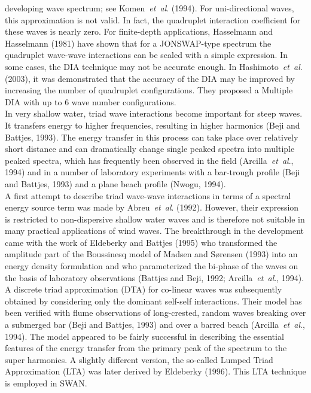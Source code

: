 \documentclass[12pt]{book}
\begin{document}
developing wave spectrum; see Komen~{\it et~al}. (1994). For uni-directional waves, this approximation is not
valid. In fact, the quadruplet interaction coefficient for these waves is nearly zero. For finite-depth
applications, Hasselmann and Hasselmann (1981) have shown that for a JONSWAP-type spectrum the quadruplet
wave-wave interactions can be scaled with a simple expression.
In some cases, the DIA technique may not be accurate enough. In Hashimoto~{\it et~al}. (2003), it was
demonstrated that the accuracy of the DIA may be improved by increasing the number of quadruplet
configurations. They proposed a Multiple DIA with up to 6 wave number configurations.
\\[2ex]
\noindent
In very shallow water, triad wave interactions become important for steep waves. It
transfers energy to higher frequencies, resulting in higher harmonics (Beji and Battjes, 1993).
The energy transfer in this process can take place over relatively short distance and can
dramatically change single peaked spectra into multiple peaked spectra, which has frequently
been observed in the field (Arcilla~{\it et~al}., 1994) and in a number of laboratory
experiments with a bar-trough profile (Beji and Battjes, 1993) and a plane beach profile
(Nwogu, 1994).
\\[2ex]
\noindent
A first attempt to describe triad wave-wave interactions in terms of a spectral energy source term was
made by Abreu~{\it et~al}. (1992). However, their expression is restricted to non-dispersive shallow water
waves and is therefore not suitable in many practical applications of wind waves. The breakthrough in the
development came with the work of Eldeberky and Battjes (1995) who transformed the amplitude part of
the Boussinesq model of Madsen and S{\o}rensen (1993) into an energy density formulation and who
parameterized the bi-phase of the waves on the basis of laboratory observations (Battjes and Beji, 1992;
Arcilla~{\it et~al}., 1994). A discrete triad approximation (DTA) for co-linear waves was subsequently
obtained by considering only the dominant self-self interactions. Their model has been verified with flume
observations of long-crested, random waves breaking over a submerged bar (Beji and Battjes, 1993) and
over a barred beach (Arcilla~{\it et~al}., 1994). The model appeared to be fairly successful in describing
the essential features of the energy transfer from the primary peak of the spectrum to the super harmonics.
A slightly different version, the so-called Lumped Triad Approximation (LTA) was later derived by
Eldeberky (1996). This LTA technique is employed in SWAN.
\nocite{Bej93B,Has98TN,Res01PTV,Vle03B,You93V,Has85HAB,Has81H,Abr92LT,Eld95B,Mad93S,Eld96}
\end{document}
